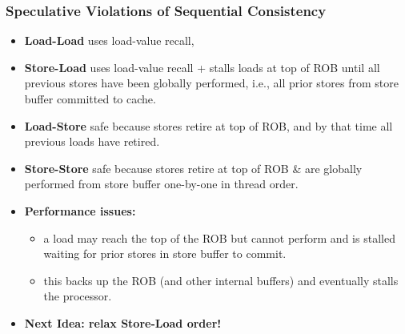 \documentclass{beamer}
\newcommand{\emp}[1]{\textcolor{DikuRed}{ #1}}
\newcommand{\emphh}[1]{\textcolor{CosGreen}{ #1}}
\begin{document}
\begin{frame}[fragile,t]
\frametitle{Speculative Violations of Sequential Consistency}

\begin{itemize}
\item \emp{\bf Load-Load} uses load-value recall,\medskip
\item \emp{\bf Store-Load} uses load-value recall + stalls loads
        at top of ROB until all previous stores have been globally performed,
            i.e., all prior stores from store buffer committed to cache.\medskip
\item \emp{\bf Load-Store} safe because stores retire at top of ROB,
            and by that time all previous loads have retired.\medskip
\item \emp{\bf Store-Store} safe because stores retire at top of ROB \&
            are globally performed from store buffer one-by-one
            in thread order.\medskip
\item \alert{\bf Performance issues:}
    \begin{itemize}
        \item a load may reach the top of the ROB but cannot perform
                and is stalled waiting for prior stores in store buffer to commit.
        \item this backs up the ROB (and other internal buffers) and eventually
                stalls the processor.\medskip
    \end{itemize}
\item \emphh{\bf Next Idea: relax Store-Load order!}
\end{itemize}

\end{frame}
\end{document}
